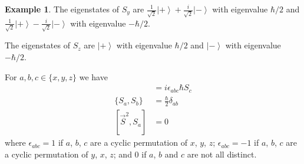 \documentclass{book}
\theoremstyle{definition}
\newtheorem{ex}[prop]{Example}
\newcommand{\ket}[1]{\ensuremath{\left| {#1} \right\rangle}}
\begin{document}
\begin{ex}
The eigenstates of $S_y$ are $\frac{1}{\sqrt{2}} \ket{+} + \frac{i}{\sqrt{2}} \ket{-}$ with eigenvalue $\hbar/2$ and $\frac{1}{\sqrt{2}} \ket{+} - \frac{i}{\sqrt{2}} \ket{-}$ with eigenvalue $-\hbar/2$.

The eigenstates of $S_z$ are $\ket{+}$ with eigenvalue $\hbar/2$ and $\ket{-}$ with eigenvalue $-\hbar/2$.

For $a,b,c \in \{x,y,z\}$ we have
\begin{align*}
[S_a,S_b] & = i \epsilon_{abc} \hbar S_c \\
\{S_a,S_b\} & = \frac{\hbar}{2} \delta_{ab} \\
[\vec{S}^2, S_a] & = 0
\end{align*}
where $\epsilon_{abc} = 1$ if $a$, $b$, $c$ are a cyclic permutation of $x$, $y$, $z$; $\epsilon_{abc} = -1$ if $a$, $b$, $c$ are a cyclic permutation of $y$, $x$, $z$; and 0 if $a$, $b$ and $c$ are not all distinct.
\end{ex}
\end{document}
